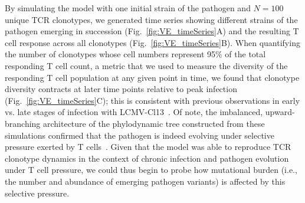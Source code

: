 By simulating the model with one initial strain of the pathogen and $N=100$ unique TCR clonotypes, we generated time series showing different strains of the pathogen emerging in succession (Fig.~\ref{fig:VE_timeSeries}A) and the resulting T cell response across all clonotypes (Fig.~\ref{fig:VE_timeSeries}B). When quantifying the number of clonotypes whose cell numbers represent 95\% of the total responding T cell count, a metric that we used to measure the diversity of the responding T cell population at any given point in time, we found that clonotype diversity contracts at later time points relative to peak infection (Fig.~\ref{fig:VE_timeSeries}C); this is consistent with previous observations in early vs. late stages of infection with LCMV-Cl13~\cite{chang2020t}. Of note, the imbalanced, upward-branching architecture of the phylodynamic tree constructed from these simulations confirmed that the pathogen is indeed evolving under selective pressure exerted by T cells~\cite{volz2013viral}. Given that the model was able to reproduce TCR clonotype dynamics in the context of chronic infection and pathogen evolution under T cell pressure, we could thus begin to probe how mutational burden (i.e., the number and abundance of emerging pathogen variants) is affected by this selective pressure.
%
